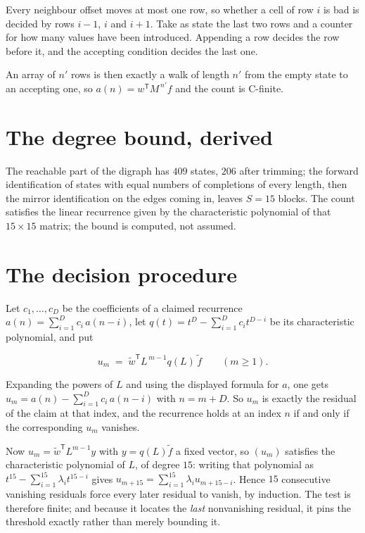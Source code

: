 \documentclass[11pt]{article}
\theoremstyle{definition}
\begin{document}
Every neighbour offset moves at most one row, so whether a cell of row $i$ is bad is decided by rows $i-1$, $i$ and $i+1$. Take as state the last two rows and a counter for how many values have been introduced. Appending a row decides the row before it, and the accepting condition decides the last one.

An array of $n'$ rows is then exactly a walk of length $n'$ from the empty state to an accepting one, so $a(n) = w^{\mathsf T}M^{\,n'}f$ and the count is C-finite.

\section{The degree bound, derived}

The reachable part of the digraph has $409$ states, $206$ after trimming; the forward identification of states with equal numbers of completions of every length, then the mirror identification on the edges coming in, leaves $S = 15$ blocks. The count satisfies the linear recurrence given by the characteristic polynomial of that $15\times15$ matrix; the bound is computed, not assumed.

\section{The decision procedure}

Let $c_1,\dots,c_D$ be the coefficients of a claimed recurrence $a(n) = \sum_{i=1}^{D} c_i\,a(n-i)$, let $q(t) = t^{D} - \sum_{i=1}^{D} c_i t^{D-i}$ be its characteristic polynomial, and put

\[u_m \;=\; \tilde w^{\mathsf T} L^{\,m-1} q(L)\,\tilde f \qquad (m \ge 1).\]

Expanding the powers of $L$ and using the displayed formula for $a$, one gets $u_m = a(n) - \sum_{i=1}^{D} c_i\,a(n-i)$ with $n = m + D$. So $u_m$ is exactly the residual of the claim at that index, and the recurrence holds at an index $n$ if and only if the corresponding $u_m$ vanishes.

Now $u_m = \tilde w^{\mathsf T} L^{m-1} y$ with $y = q(L)\tilde f$ a fixed vector, so $(u_m)$ satisfies the characteristic polynomial of $L$, of degree $15$: writing that polynomial as $t^{15} - \sum_{i=1}^{15} \lambda_i t^{15-i}$ gives $u_{m+15} = \sum_{i=1}^{15} \lambda_i u_{m+15-i}$. Hence $15$ consecutive vanishing residuals force every later residual to vanish, by induction. The test is therefore finite; and because it locates the {\itshape last} nonvanishing residual, it pins the threshold exactly rather than merely bounding it.
\end{document}

